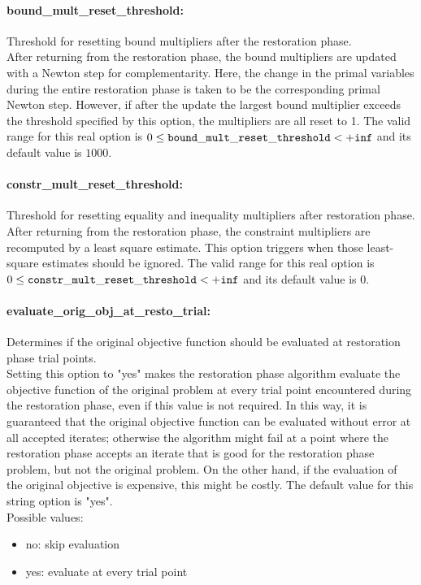 \paragraph{bound\_mult\_reset\_threshold:}\label{opt:bound_mult_reset_threshold} Threshold for resetting bound multipliers after the restoration phase. \\
 After returning from the restoration phase, the
bound multipliers are updated with a Newton step
for complementarity.  Here, the change in the
primal variables during the entire restoration
phase is taken to be the corresponding primal
Newton step. However, if after the update the
largest bound multiplier exceeds the threshold
specified by this option, the multipliers are all
reset to 1. The valid range for this real option is 
$0 \le {\tt bound\_mult\_reset\_threshold } <  {\tt +inf}$
and its default value is $1000$.


\paragraph{constr\_mult\_reset\_threshold:}\label{opt:constr_mult_reset_threshold} Threshold for resetting equality and inequality multipliers after restoration phase. \\
 After returning from the restoration phase, the
constraint multipliers are recomputed by a least
square estimate.  This option triggers when those
least-square estimates should be ignored. The valid range for this real option is 
$0 \le {\tt constr\_mult\_reset\_threshold } <  {\tt +inf}$
and its default value is $0$.


\paragraph{evaluate\_orig\_obj\_at\_resto\_trial:}\label{opt:evaluate_orig_obj_at_resto_trial} Determines if the original objective function should be evaluated at restoration phase trial points. \\
 Setting this option to "yes" makes the
restoration phase algorithm evaluate the
objective function of the original problem at
every trial point encountered during the
restoration phase, even if this value is not
required.  In this way, it is guaranteed that the
original objective function can be evaluated
without error at all accepted iterates; otherwise
the algorithm might fail at a point where the
restoration phase accepts an iterate that is good
for the restoration phase problem, but not the
original problem.  On the other hand, if the
evaluation of the original objective is
expensive, this might be costly. The default value for this string option is "yes".
\\ 
Possible values:
\begin{itemize}
   \item no: skip evaluation
   \item yes: evaluate at every trial point
\end{itemize}

